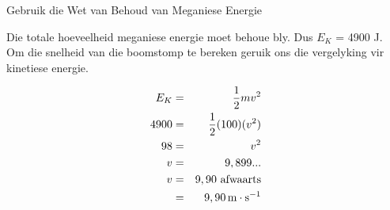 \begin{wex}{Gebruik die Wet van Behoud van Meganiese Energie}
{
Die totale hoeveelheid meganiese energie moet behoue bly. Dus $E_{K}$ = 4900 J.\\

Om die snelheid van die boomstomp te bereken geruik ons die vergelyking vir kinetiese energie.

\begin{eqnarray*}
E_{K} & = & \frac{1}{2}mv^2 \\
4900 &=& \frac{1}{2} (100) (v^2) \\
98 &=& v^2\\
v &=& 9,899...\\
v &=& 9,90 \ \text{afwaarts}\\
&=&9,90 \,\text{m} \cdot \text{s}^{-1}
\end{eqnarray*}}
\end{wex}
    \noindent
\par
            \label{m38786*secfhsst!!!underscore!!!id2130}\vspace{.5cm} 
      \noindent
